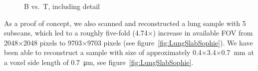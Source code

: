 \begin{figure}
{			}%
	\caption{B vs.\ T, including detail}
	\label{fig:BvsT2}
\end{figure}
\cbend

As a proof of concept, we also scanned and reconstructed a lung sample with 5 subscans, which led to a roughly five-fold (4.74\(\times\)) increase in available FOV from 2048\(\times\)2048 pixels to 9703\(\times\)9703 pixels (see figure~\ref{fig:LungSlabSophie}). We have been able to reconstruct a sample with size of approximately 0.4\(\times\)3.4\(\times\)\SI{0.7}{\milli\meter} at a voxel side length of \SI{0.7}{\micro\meter}, see figure~\ref{fig:LungSlabSophie}.

